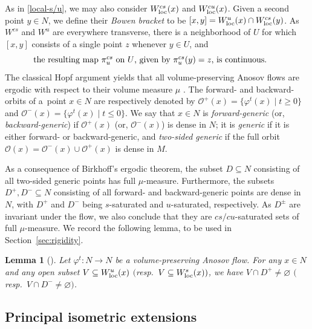 \documentclass[pdftex]{sigma}
\numberwithin{equation}{section}
\newtheorem{Lemma}[Theorem]{Lemma}
\theoremstyle{definition}
\begin{document}
As in \eqref{local-s/u}, we may also consider $W^{cs}_{\rm loc}(x)$ and $W^{cu}_{\rm loc}(x)$. Given a second point $y\in N$, we define their \emph{Bowen bracket} to be $[x,y] = W^u_{\rm loc}(x) \cap W^{cs}_{\rm loc}(y)$. As $W^{cs}$ and $W^u$ are everywhere transverse, there is a neighborhood of $U$ for which $[x,y]$ consists of a single point $z$ whenever $y\in U$, and \begin{equation}\label{pi-cs-u}
\parbox{.85\textwidth}{the resulting map $\pi^{cs}_u$ on $U$, given by $\pi^{cs}_u(y)=z$, is continuous.}
\end{equation}
The classical Hopf argument yields that all volume-preserving Anosov flows are ergodic with respect to their volume measure $\mu$ \cite[Lemma A.1]{lefeuvre2023isometric}. The forward- and backward-orbits of a~point $x \in N$ are respectively denoted by $\mathcal{O}^+(x) = \bigl\{ \varphi^t(x) \mid t \geq 0\bigr\}$ and $\mathcal{O}^-(x)= \bigl\{\varphi^t(x) \mid t \leq 0\bigr\}$.
We say that $x \in N$ is \emph{forward-generic} (or, \emph{backward-generic}) if $\mathcal{O}^+(x)$ (or, $\mathcal{O}^-(x)$) is dense in $N$; it is \emph{generic} if it is either forward- or backward-generic, and \emph{two-sided generic} if the full orbit $\mathcal{O}(x) = \mathcal{O}^-(x) \cup \mathcal{O}^+(x)$ is dense in $M$.

As a consequence of Birkhoff's ergodic theorem, the subset $D\subseteq N$ consisting of all two-sided generic points has full $\mu$-measure. Furthermore, the subsets $D^+, D^-\subseteq N$ consisting of all forward- and backward-generic points are dense in $N$, with $D^+$ and $D^-$ being $s$-saturated and $u$-saturated, respectively. As $D^\pm$ are invariant under the flow, we also conclude that they are $cs/cu$-saturated sets of full $\mu$-measure. We record the following lemma, to be used in Section~\ref{sec:rigidity}.

\begin{Lemma}[{\cite[Corollary 2.1.6]{filip2024finiteness}}] \label{lem:cor-2-1-6}
 Let $\varphi^t \colon N \rightarrow N$ be a volume-preserving Anosov flow. For any $x \in N$ and any open subset $V \subseteq W^u_{\rm loc}(x)$ $($resp.\ $V \subseteq W^s_{\rm loc}(x))$, we have $V \cap D^+\neq \varnothing$ $($resp.\ $V \cap D^- \neq \varnothing)$.
\end{Lemma}

\subsection{Principal isometric extensions}
\end{document}
